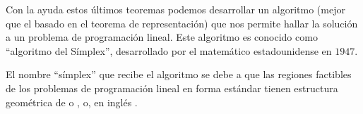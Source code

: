 Con la ayuda estos últimos teoremas podemos desarrollar un algoritmo (mejor que el basado en el teorema de representación) que nos permite hallar la solución a un problema de programación lineal. Este algoritmo es conocido como ``algoritmo del Símplex'', desarrollado por el matemático estadounidense  en $1947$.
\begin{obs}
	El nombre ``símplex'' que recibe el algoritmo se debe a que las regiones factibles de los problemas de programación lineal en forma estándar tienen estructura geométrica de  o , o, en inglés .
\end{obs}